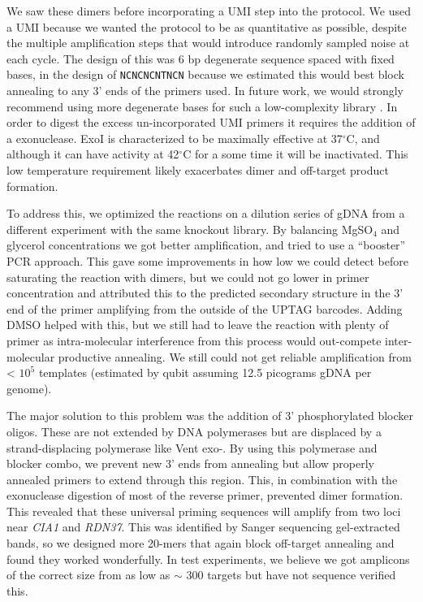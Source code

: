 We saw these dimers before incorporating a UMI step into the protocol.
We used a UMI because we wanted the protocol to be as quantitative as
possible, despite the multiple amplification steps that would introduce
randomly sampled noise at each cycle. The design of this was 6 bp
degenerate sequence spaced with fixed bases, in the design of
\texttt{NCNCNCNTNCN} because we estimated this would best block
annealing to any 3' ends of the primers used. In future work, we would
strongly recommend using more degenerate bases for such a low-complexity
library \parencite{fu2011count}. In order to digest the
excess un-incorporated UMI primers it requires the addition of a
exonuclease. ExoI is characterized to be maximally effective at
37\(^{\circ}\)C, and although it can have activity at 42\(^{\circ}\)C
for a some time \parencite{fei2015structural} it
will be inactivated. This low temperature requirement likely exacerbates
dimer and off-target product formation.

To address this, we optimized the reactions on a dilution series of gDNA
from a different experiment with the same knockout library. By balancing
MgSO\(_4\) and glycerol concentrations we got better amplification, and
tried to use a ``booster'' \parencite{ruano1989biphasic} PCR approach. 
This gave some improvements in how low we
could detect before saturating the reaction with dimers, but we could
not go lower in primer concentration and attributed this to the
predicted secondary structure in the 3' end of the primer amplifying
from the outside of the UPTAG barcodes. Adding DMSO helped with this,
but we still had to leave the reaction with plenty of primer as
intra-molecular interference from this process would out-compete
inter-molecular productive annealing. We still could not get reliable
amplification from \textless{} \(10^5\) templates (estimated by qubit
assuming 12.5 picograms gDNA per genome).

The major solution to this problem was the addition of 3' phosphorylated
blocker oligos. These are not extended by DNA polymerases but are
displaced by a strand-displacing polymerase like Vent exo-. By using
this polymerase and blocker combo, we prevent new 3' ends from annealing
but allow properly annealed primers to extend through this region. This,
in combination with the exonuclease digestion of most of the reverse
primer, prevented dimer formation. This revealed that these universal
priming sequences will amplify from two loci near \emph{CIA1} and
\emph{RDN37}. This was identified by Sanger sequencing gel-extracted
bands, so we designed more 20-mers that again block off-target annealing
and found they worked wonderfully. In test experiments, we believe we
got amplicons of the correct size from as low as \(\sim\) 300 targets
but have not sequence verified this.

